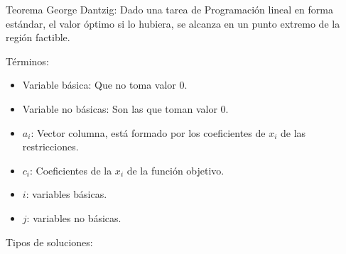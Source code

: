 \documentclass[12pt, twoside, openright]{report} %
\begin{document}
\begin{figure}[H]
{
}
	\end{figure}

	Teorema George Dantzig: Dado una tarea de Programación lineal en forma
  estándar, el valor óptimo si lo hubiera, se alcanza en un punto
  extremo de la región factible.


  
    Términos:
	\begin{itemize}
		\item Variable básica: Que no toma valor 0.
		\item
		Variable no básicas: Son las que toman valor 0.
	  \item
		\(a_i\): Vector columna, está formado por los coeficientes de
		\(x_i\) de las restricciones.
	  \item
		\(c_i\): Coeficientes de la \(x_i\) de la función objetivo.
	  \item
		\(i\): variables básicas.
	  \item
		\(j\): variables no básicas.
	\end{itemize}

	\pagebreak
    Tipos de soluciones:
\end{document}
